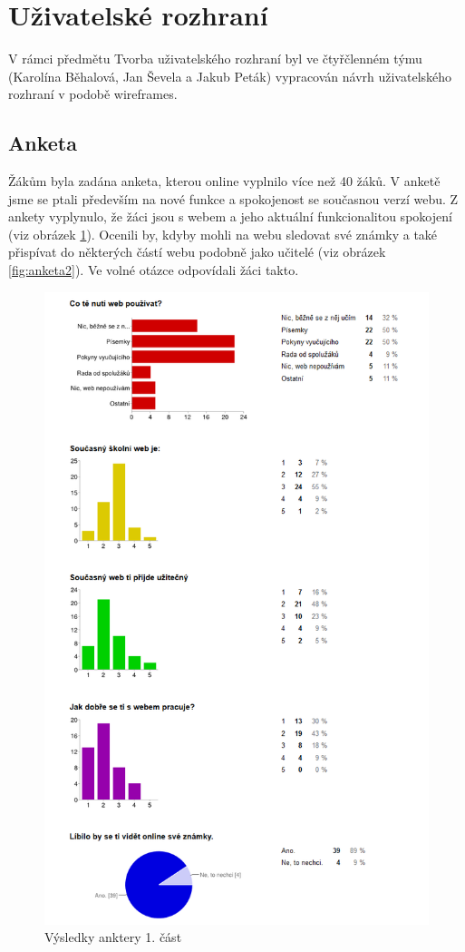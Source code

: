 \documentclass[thesis=B,czech]{FITthesis}[2012/06/26]
\begin{document}
\section{Uživatelské rozhraní}

V rámci předmětu Tvorba uživatelského rozhraní byl ve čtyřčlenném týmu (Karolína Běhalová, Jan Ševela a Jakub Peták) vypracován návrh uživatelského rozhraní v podobě wireframes.

\subsection{Anketa}

Žákům byla zadána anketa, kterou online vyplnilo více než 40 žáků. V anketě jsme se ptali především na nové funkce a spokojenost se současnou verzí webu. Z ankety vyplynulo, že žáci jsou s webem a jeho aktuální funkcionalitou spokojení (viz obrázek \ref{fig:anketa1}). Ocenili by, kdyby mohli na webu sledovat své známky a také přispívat do některých částí webu podobně jako učitelé (viz obrázek \ref{fig:anketa2}). Ve volné otázce odpovídali žáci takto.

\begin{figure}
  \centering
	\includegraphics[scale=1.2]{anketa1.png}
	\caption{Výsledky anktery 1. část} \label{fig:anketa1} 
\end{figure}
\end{document}
